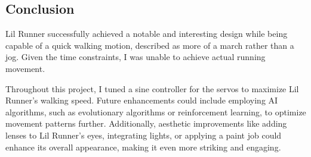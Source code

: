 \documentclass[12pt,a3paper]{article}
\begin{document}
{\begin{multicols}{2}
        \columnbreak
    
        \section*{Conclusion}
        Lil Runner successfully achieved a notable and interesting design while being capable of a quick walking motion, described as more of a march rather than a jog. Given the time constraints, I was unable to achieve actual running movement.
    
        \vspace{10}
    
        Throughout this project, I tuned a sine controller for the servos to maximize Lil Runner's walking speed. Future enhancements could include employing AI algorithms, such as evolutionary algorithms or reinforcement learning, to optimize movement patterns further. Additionally, aesthetic improvements like adding lenses to Lil Runner's eyes, integrating lights, or applying a paint job could enhance its overall appearance, making it even more striking and engaging.
    
    
    \end{multicols}
}


 
\end{document}
